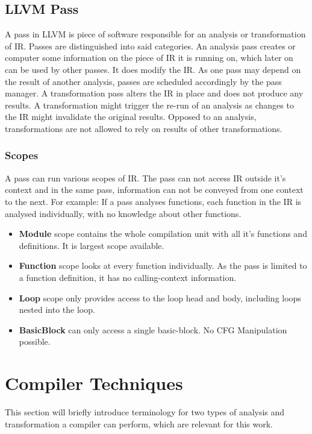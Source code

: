 \subsection{LLVM Pass}\label{llvmpass}
A pass in LLVM is piece of software responsible for an analysis or transformation of IR. Passes are distinguished into said categories. An analysis pass creates or computer some information on the piece of IR it is running on, which later on can be used by other passes. It does modify the IR. As one pass may depend on the result of another analysis, passes are scheduled accordingly by the pass manager. A transformation pass alters the IR in place and does not produce any results. A transformation might trigger the re-run of an analysis as changes to the IR might invalidate the original results. Opposed to an analysis, transformations are not allowed to rely on results of other transformations.
\subsubsection{Scopes}
A pass can run various scopes of IR. The pass can not access IR outside it's context and in the same pass, information can not be conveyed from one context to the next. For example: If a pass analyses functions, each function in the IR is analysed individually, with no knowledge about other functions.
\begin{itemize}
	\item \textbf{Module} scope contains the whole compilation unit with all it's functions and definitions. It is largest scope available.
	\item \textbf{Function} scope looks at every function individually. As the pass is limited to a function definition, it has no calling-context information. 
	\item \textbf{Loop} scope only provides access to the loop head and body, including loops nested into the loop.
	\item \textbf{BasicBlock} can only access a single basic-block. No CFG Manipulation possible.
\end{itemize}

\section{Compiler Techniques}
This section will briefly introduce terminology for two types of analysis and transformation a compiler can perform, which are relevant
for this work.
